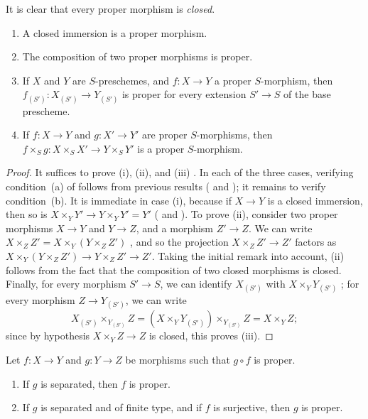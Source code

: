 It is clear that every proper morphism is \emph{closed}.

\begin{proposition}[5.4.2]
\label{II.5.4.2}
\medskip\noindent
\begin{enumerate}
  \item[{\rm(i)}] A closed immersion is a proper morphism.
  \item[{\rm(ii)}] The composition of two proper morphisms is proper.
  \item[{\rm(iii)}] If $X$ and $Y$ are $S$-preschemes, and $f:X\to Y$ a proper $S$-morphism, then $f_{(S')}:X_{(S')}\to Y_{(S')}$ is proper for every extension $S'\to S$ of the base prescheme.
  \item[{\rm(iv)}] If $f:X\to Y$ and $g:X'\to Y'$ are proper $S$-morphisms, then $f\times_S g:X\times_S X'\to Y\times_S Y'$ is a proper $S$-morphism.
\end{enumerate}
\end{proposition}

\begin{proof}
It suffices to prove (i), (ii), and (iii) .
In each of the three cases, verifying condition~(a) of  follows from previous results ( and ); it remains to verify condition~(b).
It is immediate in case (i), because if $X\to Y$ is a closed immersion, then so is $X\times_Y Y'\to Y\times_Y Y'=Y'$ ( and ).
To prove (ii), consider two proper morphisms $X\to Y$ and $Y\to Z$, and a morphism $Z'\to Z$.
We can write $X\times_Z Z'=X\times_Y(Y\times_Z Z')$ , and so the projection $X\times_Z Z'\to Z'$ factors as $X\times_Y(Y\times_Z Z')\to Y\times_Z Z'\to Z'$.
Taking the initial remark into account, (ii) follows from the fact that the composition of two closed morphisms is closed.
Finally, for every morphism $S'\to S$, we can identify $X_{(S')}$ with $X\times_Y Y_{(S')}$ ; for every morphism $Z\to Y_{(S')}$, we can write
\[
  X_{(S')}\times_{Y_{(S')}}Z=(X\times_Y Y_{(S')})\times_{Y_{(S')}}Z=X\times_Y Z;
\]
since by hypothesis $X\times_Y Z\to Z$ is closed, this proves (iii).
\end{proof}

\begin{corollary}[5.4.3]
\label{II.5.4.3}
Let $f:X\to Y$ and $g:Y\to Z$ be morphisms such that $g\circ f$ is proper.
\begin{enumerate}
  \item[{\rm(i)}] If $g$ is separated, then $f$ is proper.
  \item[{\rm(ii)}] If $g$ is separated and of finite type, and if $f$ is surjective, then $g$ is proper.
\end{enumerate}
\end{corollary}

